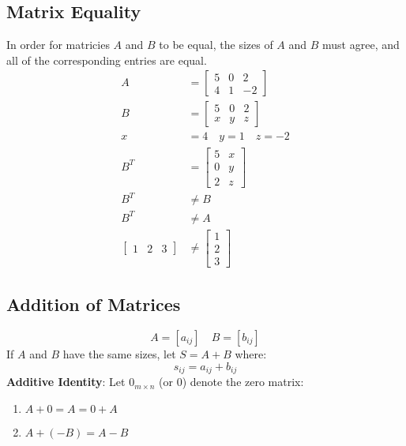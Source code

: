 \documentclass{math}
\begin{document}
\subsection*{Matrix Equality}
In order for matricies \( A \) and \( B \) to be equal, the sizes of \( A \) and
\( B \) must agree, and all of the corresponding entries are equal.
\begin{align*}
  A &= \begin{bmatrix}
    5 & 0 & 2 \\
    4 & 1 & -2
  \end{bmatrix} \\
  B &= \begin{bmatrix}
    5 & 0 & 2 \\
    x & y & z
  \end{bmatrix} \\
  x &= 4 \quad y = 1 \quad z = -2 \\
  B^T &= \begin{bmatrix}
    5 & x \\
    0 & y \\
    2 & z
  \end{bmatrix} \\
  B^T &\ne B \\
  B^T &\ne A \\
  \begin{bmatrix}1 & 2 & 3\end{bmatrix} &\ne
    \begin{bmatrix}1 \\ 2 \\ 3\end{bmatrix}
\end{align*}

\subsection*{Addition of Matrices}
\[ A = [a_{ij}] \quad B = [b_{ij}] \]
If \( A \) and \( B \) have the same sizes, let \( S = A+B \) where:
\[ s_{ij} = a_{ij}+b_{ij} \]
\textbf{Additive Identity}: Let \( 0_{m\times n} \) (or 0) denote the zero
matrix:
\begin{enumerate}
  \item \( A+0 = A = 0+A \)
  \item \( A+(-B) = A-B \)
\end{enumerate}
\end{document}
